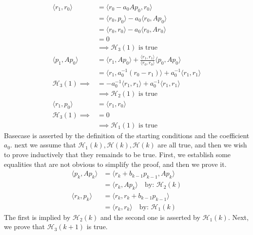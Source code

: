 \documentclass[]{article}
\begin{document}
    \begin{align*}\tag{1.2}\label{eqn:1.2}
        \langle r_1, r_0\rangle &= 
        \langle r_0 - a_0Ap_0, r_0\rangle
        \\
        &= 
        \langle 
            r_0, p_0
        \rangle - a_0\langle r_0, Ap_0\rangle
        \\
        &= 
        \langle 
            r_0, r_0
        \rangle - a_0\langle r_0, Ar_0\rangle
        \\
        &= 
        0
        \\
        & \implies \mathcal{H}_3(1) \text{ is true}
        \\
        \langle p_1, Ap_0\rangle &= 
        \langle r_1, Ap_0\rangle + \frac{\langle r_1, r_1\rangle}{\langle r_0, r_0\rangle} \langle p_0, Ap_0\rangle
        \\
        &= \langle r_1, a_0^{-1}(r_0 - r_1)\rangle
        + a_0^{-1}\langle r_1, r_1\rangle
        \\
        \mathcal{H}_3(1)\implies &= -a_0^{-1}\langle r_1, r_1\rangle + a_{0}^{-1}\langle r_1, r_1\rangle
        \\
        & \implies  \mathcal{H}_2(1) \text{ is true}
        \\
        \langle r_1, p_0\rangle &= \langle r_1, r_0\rangle
        \\
        \mathcal{H}_3(1)\implies &= 0
        \\
        & \implies \mathcal{H}_1(1) \text{ is true}
    \end{align*}
    Basecase is asserted by the definition of the starting conditions and the coefficient $a_0$. next we assume that $\mathcal{H}_1(k), \mathcal{H}(k), \mathcal{H}(k)$ are all true, and then we wish to prove inductively that they remainds to be true. First, we establish some equalities that are not obvious to simplify the proof, and then we prove it. 
    \begin{align*}\tag{1.3}\label{eqn:1.3}
        \langle p_k, Ap_k\rangle &= 
        \langle r_k + b_{k - 1}p_{k - 1}, Ap_k\rangle 
        \\
        &= \langle r_k, Ap_k\rangle \quad \text{by: } \mathcal{H}_2(k)
        \\
        \langle r_k, p_k\rangle &= 
        \langle r_k, r_k + b_{k - 1}p_{k - 1}\rangle 
        \\
        &= \langle r_k, r_k\rangle \quad \text{by: }\mathcal{H}_1(k)
    \end{align*}
    The first is implied by $\mathcal{H}_2(k)$ and the second one is asserted by $\mathcal{H}_1(k)$. Next, we prove that $\mathcal{H}_3{(k + 1)}$ is true. 
\end{document}
